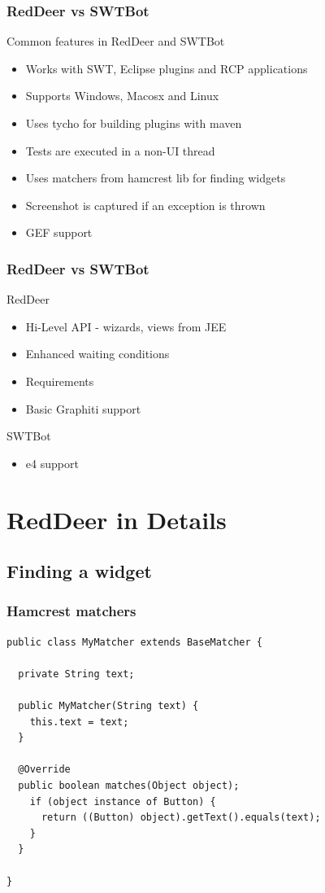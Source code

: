 \documentclass{beamer}
\begin{document}
\begin{frame}[fragile]
\frametitle{RedDeer vs SWTBot}
Common features in RedDeer and SWTBot
\begin{itemize}
\item Works with SWT, Eclipse plugins and RCP applications
\item Supports Windows, Macosx and Linux
\item Uses tycho for building plugins with maven
\item Tests are executed in a non-UI thread
\item Uses matchers from hamcrest lib for finding widgets
\item Screenshot is captured if an exception is thrown
\item GEF support
\end{itemize}
\end{frame}

\begin{frame}[fragile]
\frametitle{RedDeer vs SWTBot}
RedDeer
\begin{itemize}
\item Hi-Level API - wizards, views from JEE
\item Enhanced waiting conditions
\item Requirements
\item Basic Graphiti support
\end{itemize}
\vspace{0.5cm}
SWTBot
\begin{itemize}
\item e4 support
\end{itemize}
\end{frame}

\section{RedDeer in Details}

\subsection{Finding a widget}
\begin{frame}[fragile]
\frametitle{Hamcrest matchers}
\begin{lstlisting}
public class MyMatcher extends BaseMatcher {

  private String text;

  public MyMatcher(String text) {
    this.text = text;
  }
  
  @Override
  public boolean matches(Object object);
    if (object instance of Button) {
      return ((Button) object).getText().equals(text);
    }
  }

} 
\end{lstlisting}
\end{frame}
\end{document}
